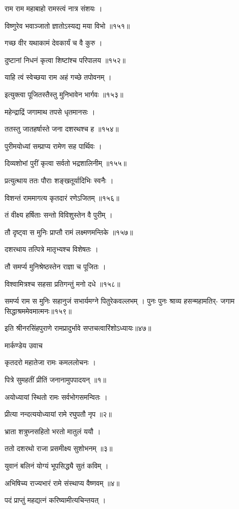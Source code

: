 राम राम महाबाहो रामस्त्वं नात्र संशयः ।

विष्णुरेव भवाञ्जातो ज्ञातोऽस्यद्य मया विभो ॥१५१॥

गच्छ वीर यथाकामं देवकार्यं च वै कुरु ।

दुष्टानां निधनं कृत्वा शिष्टांश्च परिपालय ॥१५२॥

याहि त्वं स्वेच्छया राम अहं गच्छे तपोवनम् ।

इत्युक्त्वा पूजितस्तैस्तु मुनिभावेन भार्गवः ॥१५३॥

महेन्द्राद्रिं जगामाथ तपसे धृतमानसः ।

ततस्तु जातहर्षास्ते जना दशरथश्च ह ॥१५४॥

पुरीमयोध्यां सम्प्राप्य रामेण सह पार्थिवः ।

दिव्यशोभां पुरीं कृत्वा सर्वतो भद्रशालिनीम् ॥१५५॥

प्रत्युत्थाय ततः पौराः शङ्खतूर्यादिभिः स्वनैः ।

विशन्तं राममागत्य कृतदारं रणेऽजितम् ॥१५६॥

तं वीक्ष्य हर्षिताः सन्तो विविशुस्तेन वै पुरीम् ।

तौ दृष्ट्वा स मुनिः प्राप्तौ रामं लक्ष्मणमन्तिके ॥१५७॥

दशरथाय तत्पित्रे मातृभ्यश्च विशेषतः ।

तौ समर्प्य मुनिश्रेष्ठस्तेन राज्ञा च पूजितः ।

विश्वामित्रश्च सहसा प्रतिगन्तुं मनो दधे ॥१५८॥

समर्प्य राम स मुनिः सहानुजं
सभार्यमग्ने पितुरेकवल्लभम् ।
पुनः पुनः श्राव्य हसन्महामतिर्-
जगाम सिद्धाश्रममेवमात्मनः॥१५९॥

इति श्रीनरसिंहपुराणे रामप्रादुर्भावे सप्तचत्वारिंशोऽध्यायः॥४७॥


मार्कण्डेय उवाच

कृतदरो महातेजा रामः कमललोचनः ।

पित्रे सुमहतीं प्रीतिं जनानामुपपादयन् ॥१॥

अयोध्यायां स्थितो रामः सर्वभोगसमन्वितः ।

प्रीत्या नन्दत्ययोध्यायां रामे रघुपतौ नृप ॥२॥

भ्राता शत्रुघ्नसहितो भरतो मातुलं ययौ ।

ततो दशरथो राजा प्रसमीक्ष्य सुशोभनम् ॥३॥

युवानं बलिनं योग्यं भूपसिद्ध्यै सुतं कविम् ।

अभिषिच्य राज्यभारं रामे संस्थाप्य वैष्णवम् ॥४॥

पदं प्राप्तुं महद्यत्नं करिष्यामीत्यचिन्तयत् ।

